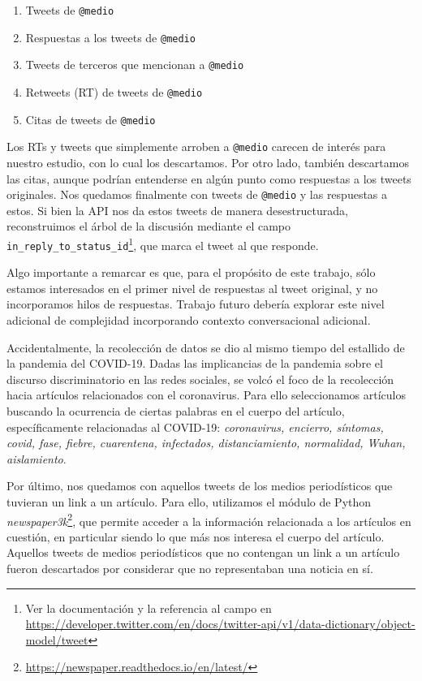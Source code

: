 \begin{enumerate}
    \item Tweets de \verb|@medio|
    \item Respuestas a los tweets de \verb|@medio|
    \item Tweets de terceros que mencionan a \verb|@medio|
    \item Retweets (RT) de tweets de \verb|@medio|
    \item Citas de tweets de \verb|@medio|
\end{enumerate}

Los RTs y tweets que simplemente arroben a \verb|@medio| carecen de interés para nuestro estudio, con lo cual los descartamos. Por otro lado, también descartamos las citas, aunque podrían entenderse en algún punto como respuestas a los tweets originales. Nos quedamos finalmente con tweets de \verb|@medio| y las respuestas a estos. Si bien la API nos da estos tweets de manera desestructurada, reconstruimos el árbol de la discusión mediante el campo \verb|in_reply_to_status_id|\footnote{Ver la documentación y la referencia al campo en \url{https://developer.twitter.com/en/docs/twitter-api/v1/data-dictionary/object-model/tweet}}, que marca el tweet al que responde.

Algo importante a remarcar es que, para el propósito de este trabajo, sólo estamos interesados en el primer nivel de respuestas al tweet original, y no incorporamos hilos de respuestas. Trabajo futuro debería explorar este nivel adicional de complejidad incorporando contexto conversacional adicional.

Accidentalmente, la recolección de datos se dio al mismo tiempo del estallido de la pandemia del COVID-19. Dadas las implicancias de la pandemia sobre el discurso discriminatorio en las redes sociales, se volcó el foco de la recolección hacia artículos relacionados con el coronavirus. Para ello seleccionamos artículos buscando la ocurrencia de ciertas palabras en el cuerpo del artículo, específicamente relacionadas al COVID-19: \emph{coronavirus, encierro, síntomas, covid, fase, fiebre, cuarentena, infectados, distanciamiento, normalidad,  Wuhan, aislamiento}.

Por último, nos quedamos con aquellos tweets de los medios periodísticos que tuvieran un link a un artículo. Para ello, utilizamos el módulo de Python \emph{newspaper3k}\footnote{\url{https://newspaper.readthedocs.io/en/latest/}}, que permite acceder a la información relacionada a los artículos en cuestión, en particular siendo lo que más nos interesa el cuerpo del artículo. Aquellos tweets de medios periodísticos que no contengan un link a un artículo fueron descartados por considerar que no representaban una noticia en sí.

